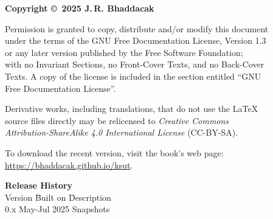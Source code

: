 \thispagestyle{empty}
{\footnotesize
\noindent\textbf{Copyright \copyright\ 2025 J.\,R. Bhaddacak}

\parskip=3mm
\noindent 
Permission is granted to copy, distribute and/or modify this document\\
under the terms of the GNU Free Documentation License, Version 1.3\\
or any later version published by the Free Software Foundation;\\
with no Invariant Sections, no Front-Cover Texts, and no Back-Cover\\
Texts.  A copy of the license is included in the section entitled ``GNU\\
Free Documentation License''.

\parskip=3mm
\noindent 
Derivative works, including translations, that do not use the \LaTeX\\
source files directly may be relicensed to \emph{Creative Commons\\
Attribution-ShareAlike 4.0 International License} (CC-BY-SA).

\parskip=3mm
\noindent 
To download the recent version, visit the book's web page:\\
\url{https://bhaddacak.github.io/ksut}.

\begin{tabbing}
\textbf{Release History}\\
Version \hspace{4mm} \= Built on \hspace{15mm} \= Description\\
0.x \>  May-Jul 2025 \> Snapshots \\
\end{tabbing}
}
